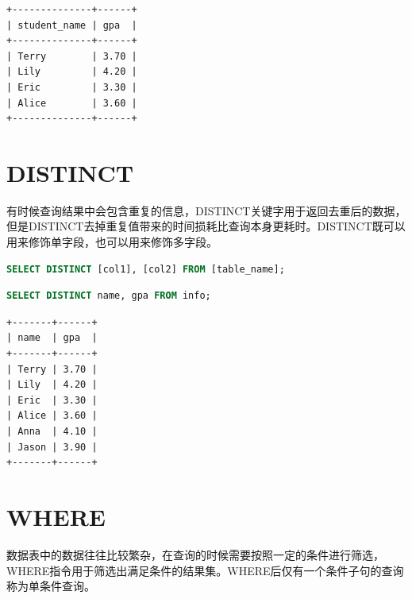 \documentclass[12pt, openany, oneside]{book}
\begin{document}
\begin{tcolorbox}
\begin{verbatim}
+--------------+------+
| student_name | gpa  |
+--------------+------+
| Terry        | 3.70 |
| Lily         | 4.20 |
| Eric         | 3.30 |
| Alice        | 3.60 |
+--------------+------+
\end{verbatim}
\end{tcolorbox}

\vspace{0.5cm}

\section{DISTINCT}

有时候查询结果中会包含重复的信息，DISTINCT关键字用于返回去重后的数据，但是DISTINCT去掉重复值带来的时间损耗比查询本身更耗时。DISTINCT既可以用来修饰单字段，也可以用来修饰多字段。

\vspace{-0.5cm}

\begin{lstlisting}[language=SQL]
SELECT DISTINCT [col1], [col2] FROM [table_name];
\end{lstlisting}

\vspace{0.5cm}


\begin{lstlisting}[language=SQL]
SELECT DISTINCT name, gpa FROM info;
\end{lstlisting}

\begin{tcolorbox}
\begin{verbatim}
+-------+------+
| name  | gpa  |
+-------+------+
| Terry | 3.70 |
| Lily  | 4.20 |
| Eric  | 3.30 |
| Alice | 3.60 |
| Anna  | 4.10 |
| Jason | 3.90 |
+-------+------+
\end{verbatim}
\end{tcolorbox}

\vspace{0.5cm}

\section{WHERE}

数据表中的数据往往比较繁杂，在查询的时候需要按照一定的条件进行筛选，WHERE指令用于筛选出满足条件的结果集。WHERE后仅有一个条件子句的查询称为单条件查询。
\end{document}
